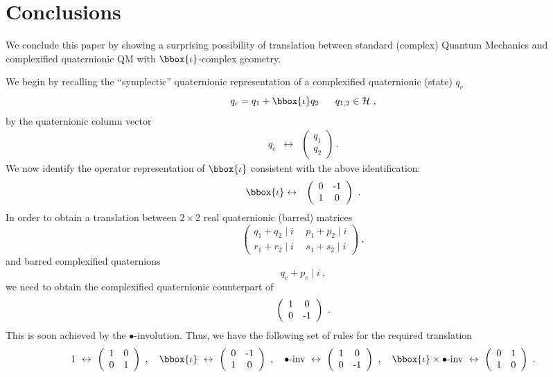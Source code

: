 \section{Conclusions}
\label{s6}

We conclude this paper by showing a surprising possibility of translation
between standard (complex) Quantum Mechanics and complexified quaternionic QM
with $\bbox{\iota}$-complex geometry.

We begin by recalling the ``symplectic'' quaternionic representation of a 
complexified quaternionic (state) $q_c$
\[ q_c = q_1 + \bbox{\iota} q _2 ~~~~~q_{1,2} \in {\cal H}~,\]
by the quaternionic column vector
\begin{eqnarray*}
q_c & \leftrightarrow & 
\left( \begin{array}{c} q_1 \\ q_2 \end{array} \right)~.
\end{eqnarray*}
We now identify the operator representation of $\bbox{\iota}$ consistent 
with the above identification:
\begin{eqnarray*}
\bbox{\iota} & \leftrightarrow & 
\left( \begin{array}{cc} 0 & $-$1 \\ 1 & 0  \end{array} \right)~.
\end{eqnarray*}
In order to obtain a translation between $2\times 2$ real quaternionic 
(barred) matrices
\[
\left( \begin{array}{cc} 
q_1 + q_2 \mid i & ~~p_1 + p_2 \mid i \\
r_1 + r_2 \mid i & ~~s_1 + s_2 \mid i 
\end{array} \right)~,
\]
and barred complexified quaternions
\[ q_c + p_c \mid  i~, \]
we need to obtain the complexified quaternionic counterpart of
\[
\left( \begin{array}{cc} 
1 & 0 \\
0 & $-$1 
\end{array} \right)~.
\]
This is soon achieved by the $\bullet$-involution. Thus, we have the 
following set of rules for the required translation
\[
1 ~ \leftrightarrow ~  
\left( \begin{array}{cc} 1 & 0 \\ 0 & 1  \end{array} \right)~,~~~
\bbox{\iota} ~ \leftrightarrow ~  
\left( \begin{array}{cc} 0 & $-$1 \\ 1 & 0  \end{array} \right)~,~~~
\bullet \mbox{-inv} ~ \leftrightarrow ~  
\left( \begin{array}{cc} 1 & 0 \\ 0 & $-$1  \end{array} \right)~,~~~
\bbox{\iota} \times \bullet \mbox{-inv}  ~ \leftrightarrow ~  
\left( \begin{array}{cc} 0 & 1 \\ 1 & 0  \end{array} \right)~.
\]
